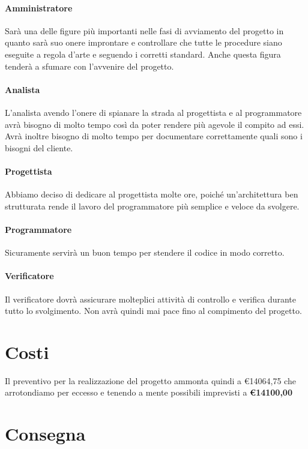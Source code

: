 \paragraph{Amministratore} Sarà una delle figure più importanti nelle fasi di avviamento del progetto in quanto sarà suo onere improntare e controllare che tutte le procedure siano eseguite a regola d'arte e seguendo i corretti standard. Anche questa figura tenderà a sfumare con l'avvenire del progetto.

\paragraph{Analista}L'analista avendo l'onere di spianare la strada al progettista e al programmatore avrà bisogno di molto tempo così da poter rendere più agevole il compito ad essi. Avrà inoltre bisogno di molto tempo per documentare correttamente quali sono i bisogni del cliente.

\paragraph{Progettista} Abbiamo deciso di dedicare al progettista molte ore, poiché un'architettura ben strutturata rende il lavoro del programmatore più semplice e veloce da svolgere.

\paragraph{Programmatore} Sicuramente servirà un buon tempo per stendere il codice in modo corretto.

\paragraph{Verificatore} Il verificatore dovrà assicurare molteplici attività di controllo e verifica durante tutto lo svolgimento. Non avrà quindi mai pace fino al compimento del progetto.

\section{Costi}

Il preventivo per la realizzazione del progetto ammonta quindi a €14064,75 che arrotondiamo per eccesso e tenendo a mente possibili imprevisti a \textbf{€14100,00}

\section{Consegna}

